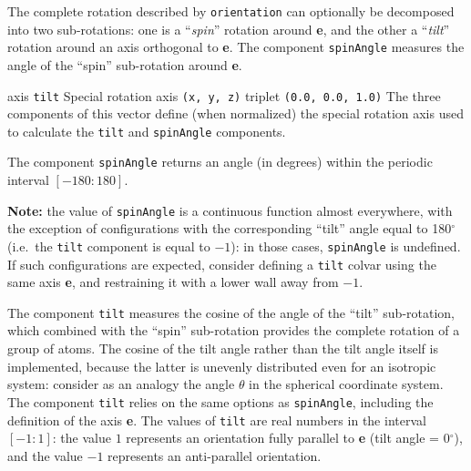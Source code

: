 The complete rotation described by \texttt{orientation} can optionally be decomposed into two sub-rotations: one is a ``\emph{spin}'' rotation around \textbf{e}, and the other a ``\emph{tilt}'' rotation around an axis orthogonal to \textbf{e}.
The component \texttt{spinAngle} measures the angle of the ``spin'' sub-rotation around \textbf{e}.

\begin{cvcoptions}
\item %
\item %
\item %
\item %
  \keydef
    {axis}{%
    \texttt{tilt}}{%
    Special rotation axis}{%
    \texttt{(x, y, z)} triplet}{%
    \texttt{(0.0, 0.0, 1.0)}}{%
    The three components of this vector define (when normalized) the special rotation axis used to calculate the \texttt{tilt} and \texttt{spinAngle} components.}
\end{cvcoptions}
The component \texttt{spinAngle} returns an angle (in degrees) within the periodic interval $[-180:180]$.

\textbf{Note:} the value of \texttt{spinAngle} is a continuous function almost everywhere, with the exception of configurations with the corresponding ``tilt'' angle equal to 180$^\circ$ (i.e.~the \texttt{tilt} component is equal to $-1$): in those cases, \texttt{spinAngle} is undefined.  If such configurations are expected, consider defining a \texttt{tilt} colvar using the same axis \textbf{e}, and restraining it with a lower wall away from $-1$.



The component \texttt{tilt} measures the cosine of the angle of the ``tilt'' sub-rotation, which combined with the ``spin'' sub-rotation provides the complete rotation of a group of atoms.
The cosine of the tilt angle rather than the tilt angle itself is implemented, because the latter is unevenly distributed even for an isotropic system: consider as an analogy the angle $\theta$ in the spherical coordinate system.
The component \texttt{tilt} relies on the same options as \texttt{spinAngle}, including the definition of the axis \textbf{e}.
The values of \texttt{tilt} are real numbers in the interval $[-1:1]$: the value $1$ represents an orientation fully parallel to \textbf{e} (tilt angle = 0$^\circ$), and the value $-1$ represents an anti-parallel orientation.

